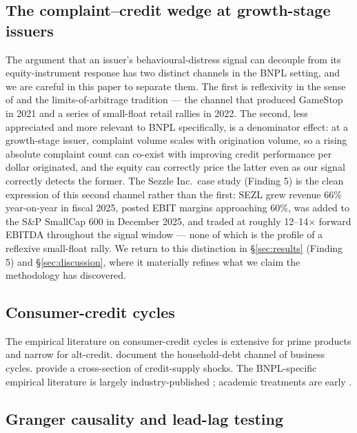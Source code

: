 \documentclass[11pt,a4paper]{article}
\begin{document}
\subsection{The complaint--credit wedge at growth-stage issuers}

The argument that an issuer's behavioural-distress signal can decouple from its equity-instrument response has two distinct channels in the BNPL setting, and we are careful in this paper to separate them. The first is reflexivity in the sense of \citet{shiller1981volatility} and the limits-of-arbitrage tradition \citep{shleifervishny1997limits,delongetal1990noise} --- the channel that produced GameStop in 2021 and a series of small-float retail rallies in 2022. The second, less appreciated and more relevant to BNPL specifically, is a denominator effect: at a growth-stage issuer, complaint volume scales with origination volume, so a rising absolute complaint count can co-exist with improving credit performance per dollar originated, and the equity can correctly price the latter even as our signal correctly detects the former. The Sezzle Inc.\ case study (Finding 5) is the clean expression of this second channel rather than the first: SEZL grew revenue 66\% year-on-year in fiscal 2025, posted EBIT margins approaching 60\%, was added to the S\&P SmallCap 600 in December 2025, and traded at roughly 12--14$\times$ forward EBITDA throughout the signal window --- none of which is the profile of a reflexive small-float rally. We return to this distinction in §\ref{sec:results} (Finding 5) and §\ref{sec:discussion}, where it materially refines what we claim the methodology has discovered.

\subsection{Consumer-credit cycles}

The empirical literature on consumer-credit cycles is extensive for prime products and narrow for alt-credit. \citet{mianrampinisufi2017} document the household-debt channel of business cycles. \citet{adelinoschoar2016} provide a cross-section of credit-supply shocks. The BNPL-specific empirical literature is largely industry-published \citep{cfpb2022bnplmarket,affirmpolicy2024}; academic treatments are early \citep{difilippo2018marketplace,beck2024bnpl}.

\subsection{Granger causality and lead-lag testing}
\end{document}
